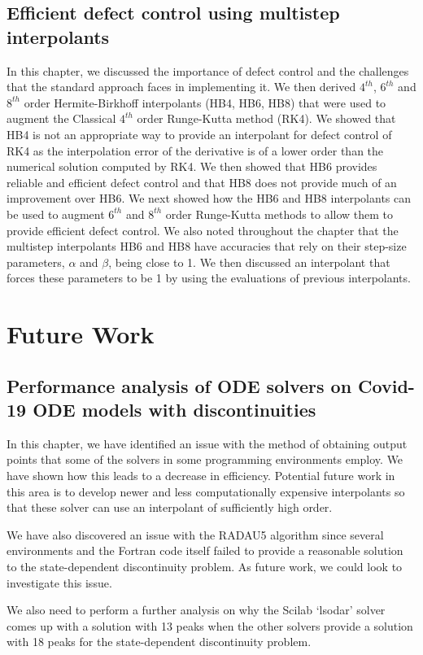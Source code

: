\documentclass{report}
\begin{document}
\subsection{Efficient defect control using multistep interpolants}
In this chapter, we discussed the importance of defect control and the challenges that the standard approach faces in implementing it. We then derived $4^{th}$, $6^{th}$ and $8^{th}$ order Hermite-Birkhoff interpolants (HB4, HB6, HB8) that were used to augment the Classical $4^{th}$ order Runge-Kutta method (RK4). We showed that HB4 is not an appropriate way to provide an interpolant for defect control of RK4 as the interpolation error of the derivative is of a lower order than the numerical solution computed by RK4. We then showed that HB6 provides reliable and efficient defect control and that HB8 does not provide much of an improvement over HB6. We next showed how the HB6 and HB8 interpolants can be used to augment $6^{th}$ and $8^{th}$ order Runge-Kutta methods to allow them to provide efficient defect control. We also noted throughout the chapter that the multistep interpolants HB6 and HB8 have accuracies that rely on their step-size parameters, $\alpha$ and $\beta$, being close to 1. We then discussed an interpolant that forces these parameters to be 1 by using the evaluations of previous interpolants.

\section{Future Work}
\subsection{Performance analysis of ODE solvers on Covid-19 ODE models with discontinuities}
In this chapter, we have identified an issue with the method of obtaining output points that some of the solvers in some programming environments employ. We have shown how this leads to a decrease in efficiency. Potential future work in this area is to develop newer and less computationally expensive interpolants so that these solver can use an interpolant of sufficiently high order.

We have also discovered an issue with the RADAU5 algorithm since several environments and the Fortran code itself failed to provide a reasonable solution to the state-dependent discontinuity problem. As future work, we could look to investigate this issue. 

We also need to perform a further analysis on why the Scilab `lsodar' solver comes up with a solution with 13 peaks when the other solvers provide a solution with 18 peaks for the state-dependent discontinuity problem.
\end{document}

